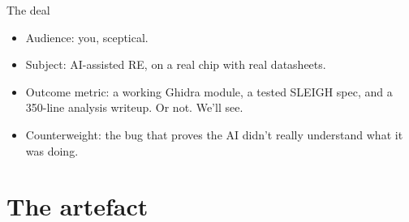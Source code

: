 \documentclass[aspectratio=169,11pt]{beamer}
\begin{document}
\begin{frame}{The deal}
\begin{itemize}
  \item Audience: you, sceptical.
  \item Subject: AI-assisted RE, on a real chip with real datasheets.
  \item Outcome metric: a working Ghidra module, a tested SLEIGH spec,
        and a 350-line analysis writeup. Or not. We'll see.
  \item Counterweight: the bug that proves the AI didn't really
        understand what it was doing.
\end{itemize}
\end{frame}

\section{The artefact}
\end{document}
